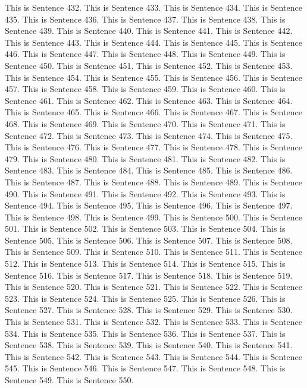 \documentclass{article}
\begin{document}
This is Sentence 432.
This is Sentence 433.
This is Sentence 434.
This is Sentence 435.
This is Sentence 436.
This is Sentence 437.
This is Sentence 438.
This is Sentence 439.
This is Sentence 440.
This is Sentence 441.
This is Sentence 442.
This is Sentence 443.
This is Sentence 444.
This is Sentence 445.
This is Sentence 446.
This is Sentence 447.
This is Sentence 448.
This is Sentence 449.
This is Sentence 450.
This is Sentence 451.
This is Sentence 452.
This is Sentence 453.
This is Sentence 454.
This is Sentence 455.
This is Sentence 456.
This is Sentence 457.
This is Sentence 458.
This is Sentence 459.
This is Sentence 460.
This is Sentence 461.
This is Sentence 462.
This is Sentence 463.
This is Sentence 464.
This is Sentence 465.
This is Sentence 466.
This is Sentence 467.
This is Sentence 468.
This is Sentence 469.
This is Sentence 470.
This is Sentence 471.
This is Sentence 472.
This is Sentence 473.
This is Sentence 474.
This is Sentence 475.
This is Sentence 476.
This is Sentence 477.
This is Sentence 478.
This is Sentence 479.
This is Sentence 480.
This is Sentence 481.
This is Sentence 482.
This is Sentence 483.
This is Sentence 484.
This is Sentence 485.
This is Sentence 486.
This is Sentence 487.
This is Sentence 488.
This is Sentence 489.
This is Sentence 490.
This is Sentence 491.
This is Sentence 492.
This is Sentence 493.
This is Sentence 494.
This is Sentence 495.
This is Sentence 496.
This is Sentence 497.
This is Sentence 498.
This is Sentence 499.
This is Sentence 500.
This is Sentence 501.
This is Sentence 502.
This is Sentence 503.
This is Sentence 504.
This is Sentence 505.
This is Sentence 506.
This is Sentence 507.
This is Sentence 508.
This is Sentence 509.
This is Sentence 510.
This is Sentence 511.
This is Sentence 512.
This is Sentence 513.
This is Sentence 514.
This is Sentence 515.
This is Sentence 516.
This is Sentence 517.
This is Sentence 518.
This is Sentence 519.
This is Sentence 520.
This is Sentence 521.
This is Sentence 522.
This is Sentence 523.
This is Sentence 524.
This is Sentence 525.
This is Sentence 526.
This is Sentence 527.
This is Sentence 528.
This is Sentence 529.
This is Sentence 530.
This is Sentence 531.
This is Sentence 532.
This is Sentence 533.
This is Sentence 534.
This is Sentence 535.
This is Sentence 536.
This is Sentence 537.
This is Sentence 538.
This is Sentence 539.
This is Sentence 540.
This is Sentence 541.
This is Sentence 542.
This is Sentence 543.
This is Sentence 544.
This is Sentence 545.
This is Sentence 546.
This is Sentence 547.
This is Sentence 548.
This is Sentence 549.
This is Sentence 550.
\end{document}
